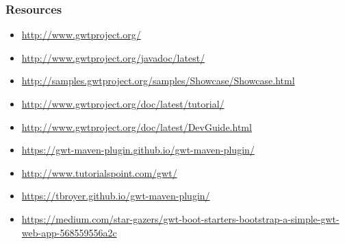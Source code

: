 \documentclass[10pt,table, xcolor=pdflatex]{beamer}
\begin{document}
\begin{frame}\frametitle{Resources}
	\begin{itemize}
        \item \url{http://www.gwtproject.org/}
        \item \url{http://www.gwtproject.org/javadoc/latest/}
        \item \url{http://samples.gwtproject.org/samples/Showcase/Showcase.html}
        \medskip
        \item \url{http://www.gwtproject.org/doc/latest/tutorial/}
        \item \url{http://www.gwtproject.org/doc/latest/DevGuide.html}
        \item \url{https://gwt-maven-plugin.github.io/gwt-maven-plugin/}
		\item \url{http://www.tutorialspoint.com/gwt/}
		\item \url{https://tbroyer.github.io/gwt-maven-plugin/}
		\item \url{https://medium.com/star-gazers/gwt-boot-starters-bootstrap-a-simple-gwt-web-app-568559556a2c}
	\end{itemize}
\end{frame}



\end{document}
